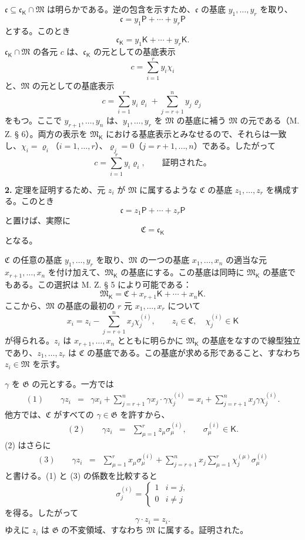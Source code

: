 $\mathfrak c\subseteq\mathfrak c_{\mathsf K}\cap\mathfrak M$ は明らかである。逆の包含を示すため、$\mathfrak c$ の基底 $y_1,\ldots,y_r$ を取り、
\[
\mathfrak c=y_1\mathsf P+\cdots+y_r\mathsf P
\]
とする。このとき
\[
\mathfrak c_{\mathsf K}=y_1\mathsf K+\cdots+y_r\mathsf K.
\]
$\mathfrak c_{\mathsf K}\cap\mathfrak M$ の各元 $c$ は、$\mathfrak c_{\mathsf K}$ の元としての基底表示
\[
c=\sum_{i=1}^{r}y_i\chi_i
\]
と、$\mathfrak M$ の元としての基底表示
\[
c=\sum_{i=1}^{r}y_i\varrho_i+\sum_{j=r+1}^{n}y_j\varrho_j
\]
をもつ。ここで $y_{r+1},\ldots,y_n$ は、$y_1,\ldots,y_r$ を $\mathfrak M$ の基底に補う $\mathfrak M$ の元である（M. Z. § 6）。両方の表示を $\mathfrak M_{\mathsf K}$ における基底表示とみなせるので、それらは一致し、$\chi_i=\varrho_i$（$i=1,\ldots,r$）、$\varrho_j=0$（$j=r+1,\ldots,n$）である。したがって
\[
c=\sum_{i=1}^{r}y_i\varrho_i,
\qquad\text{証明された。}
\]

\textbf{2.} 定理を証明するため、元 $z_i$ が $\mathfrak M$ に属するような $\mathfrak C$ の基底 $z_1,\ldots,z_r$ を構成する。このとき
\[
\mathfrak c=z_1\mathsf P+\cdots+z_r\mathsf P
\]
と置けば、実際に
\[
\mathfrak C=\mathfrak c_{\mathsf K}
\]
となる。

$\mathfrak C$ の任意の基底 $y_1,\ldots,y_r$ を取り、$\mathfrak M$ の一つの基底 $x_1,\ldots,x_n$ の適当な元 $x_{r+1},\ldots,x_n$ を付け加えて、$\mathfrak M_{\mathsf K}$ の基底にする。この基底は同時に $\mathfrak M_{\mathsf K}$ の基底でもある。この選択は M. Z. § 5 により可能である：
\[
\mathfrak M_{\mathsf K}=\mathfrak C+x_{r+1}\mathsf K+\cdots+x_n\mathsf K.
\]
ここから、$\mathfrak M$ の基底の最初の $r$ 元 $x_1,\ldots,x_r$ について
\[
x_i=z_i-\sum_{j=r+1}^{n}x_j\chi_j^{(i)},\qquad
z_i\in\mathfrak C,\quad \chi_j^{(i)}\in\mathsf K
\]
が得られる。$z_i$ は $x_{r+1},\ldots,x_n$ とともに明らかに $\mathfrak M_{\mathsf K}$ の基底をなすので線型独立であり、$z_1,\ldots,z_r$ は $\mathfrak C$ の基底である。この基底が求める形であること、すなわち $z_i\in\mathfrak M$ を示す。

$\gamma$ を $\mathfrak G$ の元とする。一方では
\[
\begin{array}{rcl}
(1)\qquad \gamma z_i
&=&\gamma x_i+\displaystyle\sum_{j=r+1}^{n}\gamma x_j\cdot \gamma\chi_j^{(i)}
=x_i+\displaystyle\sum_{j=r+1}^{n}x_j\gamma\chi_j^{(i)}.
\end{array}
\]
他方では、$\mathfrak C$ がすべての $\gamma\in\mathfrak G$ を許すから、
\[
\begin{array}{rcl}
(2)\qquad \gamma z_i&=&\displaystyle\sum_{\mu=1}^{r}z_\mu\sigma_\mu^{(i)},
\qquad \sigma_\mu^{(i)}\in\mathsf K.
\end{array}
\]
(2) はさらに
\[
\begin{array}{rcl}
(3)\qquad \gamma z_i
&=&\displaystyle\sum_{\mu=1}^{r}x_\mu\sigma_\mu^{(i)}
+\displaystyle\sum_{j=r+1}^{n}x_j\sum_{\mu=1}^{r}\chi_j^{(\mu)}\sigma_\mu^{(i)}
\end{array}
\]
と書ける。(1) と (3) の係数を比較すると
\[
\sigma_j^{(i)}=
\begin{cases}
1 & i=j,\\
0 & i\ne j
\end{cases}
\]
を得る。したがって
\[
\gamma\cdot z_i=z_i.
\]
ゆえに $z_i$ は $\mathfrak G$ の不変領域、すなわち $\mathfrak M$ に属する。証明された。

